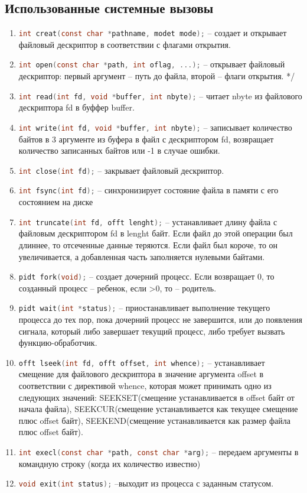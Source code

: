\documentclass[12pt]{article}
\begin{document}
\subsection*{Использованные системные вызовы}

\begin{enumerate}
\item \lstinline[language=C]|int creat(const char *pathname, modet mode);| -- создает и открывает
файловый дескриптор в соответствии с флагами открытия.
\item \lstinline[language=C]|int open(const char *path, int oflag, ...);| -- открывает файловый дескриптор: первый аргумент -- путь до файла, второй -- флаги открытия. */
\item \lstinline[language=C]|int read(int fd, void *buffer, int nbyte);| -- читает nbyte из файлового дескриптора fd в буффер buffer.
\item \lstinline[language=C]|int write(int fd, void *buffer, int nbyte);| -- записывает количество байтов
в 3 аргументе из буфера в файл с дескриптором fd, возвращает количество
записанных байтов или -1 в случае ошибки.
\item \lstinline[language=C]|int close(int fd);| -- закрывает файловый дескриптор.
\item \lstinline[language=C]|int fsync(int fd);| -- синхронизирует состояние файла в памяти с его состоянием
на диске
\item \lstinline[language=C]|int truncate(int fd, offt lenght);| -- устанавливает длину файла с файловым
дескриптором fd в lenght байт. Если файл до этой операции был длиннее, то
отсеченные данные теряются. Если файл был короче, то он увеличивается, а
добавленная часть заполняется нулевыми байтами.
\item \lstinline[language=C]|pidt fork(void);| -- создает дочерний процесс. Если возвращает 0, то созданный
процесс -- ребенок, если >0, то -- родитель.
\item  \lstinline[language=C]|pidt wait(int *status);| -- приостанавливает выполнение текущего процесса
до тех пор, пока дочерний процесс не завершится, или до появления сигнала, который либо завершает текущий процесс, либо требует вызвать функцию-обработчик.
\item \lstinline[language=C]|offt lseek(int fd, offt offset, int whence);| -- устанавливает смещение для файлового дескриптора в значение аргумента offset в соответствии с директивой
whence, которая может принимать одно из следующих значений: SEEKSET(смещение устанавливается в offset байт от начала файла), SEEKCUR(смещение устанавливается как текущее смещение плюс offset байт), SEEKEND(смещение устанавливается как размер файла плюс offset байт).
\item \lstinline[language=C]|int execl(const char *path, const char *arg);| -- передаем аргументы в командную строку (когда их количество известно)
\item \lstinline[language=C]|void exit(int status);| --выходит из процесса с заданным статусом.

\end{enumerate}
\end{document}
